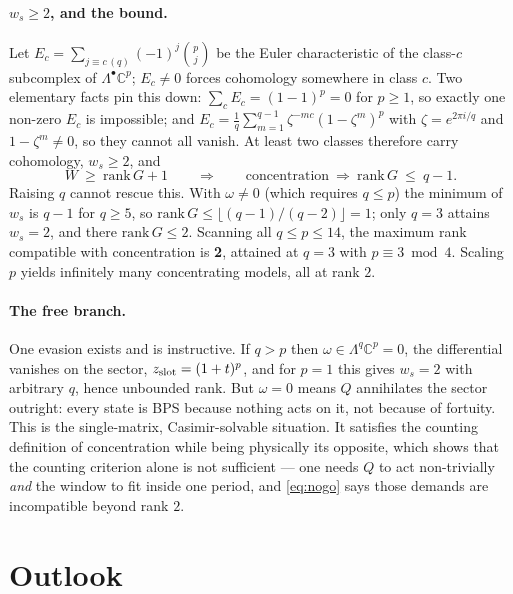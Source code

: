 \documentclass[10pt]{article}
\newcommand{\rank}{\mathrm{rank}\,}
\begin{document}
\paragraph{$w_s\ge2$, and the bound.}
Let $E_c=\sum_{j\equiv c\,(q)}(-1)^j\binom pj$ be the Euler characteristic of the class-$c$ subcomplex of $\Lambda^\bullet\mathbb C^p$; $E_c\ne0$ forces cohomology somewhere in class $c$. Two elementary facts pin this down: $\sum_cE_c=(1-1)^p=0$ for $p\ge1$, so exactly one non-zero $E_c$ is impossible; and $E_c=\tfrac1q\sum_{m=1}^{q-1}\zeta^{-mc}(1-\zeta^m)^p$ with $\zeta=e^{2\pi i/q}$ and $1-\zeta^m\ne0$, so they cannot all vanish. At least two classes therefore carry cohomology, $w_s\ge2$, and
\begin{equation}
W\ \ge\ \rank G+1\qquad\Longrightarrow\qquad \text{concentration}\ \Rightarrow\ \rank G\ \le\ q-1 .
\label{eq:nogo}
\end{equation}
Raising $q$ cannot rescue this. With $\omega\ne0$ (which requires $q\le p$) the minimum of $w_s$ is $q-1$ for $q\ge5$, so $\rank G\le\lfloor(q-1)/(q-2)\rfloor=1$; only $q=3$ attains $w_s=2$, and there $\rank G\le2$. Scanning all $q\le p\le14$, the maximum rank compatible with concentration is \textbf{2}, attained at $q=3$ with $p\equiv3\bmod4$. Scaling $p$ yields infinitely many concentrating models, all at rank $2$.

\paragraph{The free branch.}
One evasion exists and is instructive. If $q>p$ then $\omega\in\Lambda^q\mathbb C^p=0$, the differential vanishes on the sector, $z_{\rm slot}=(1+t)^p$, and for $p=1$ this gives $w_s=2$ with arbitrary $q$, hence unbounded rank. But $\omega=0$ means $Q$ annihilates the sector outright: every state is BPS because nothing acts on it, not because of fortuity. This is the single-matrix, Casimir-solvable situation. It satisfies the counting definition of concentration while being physically its opposite, which shows that the counting criterion alone is not sufficient --- one needs $Q$ to act non-trivially \emph{and} the window to fit inside one period, and \eqref{eq:nogo} says those demands are incompatible beyond rank $2$.

\section{Outlook}
\end{document}
